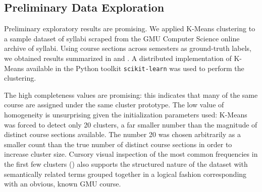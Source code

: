 \subsection{Preliminary Data Exploration}

Preliminary exploratory results are promising. We applied K-Means
clustering to a sample dataset of syllabi scraped from the GMU Computer
Science online archive of syllabi. Using course sections across semesters
as ground-truth labels, we obtained results summarized in
 and . A
distributed implementation of K-Means available in the Python toolkit
\texttt{scikit-learn} was used to perform the clustering.

The high completeness values are promising: this indicates that many of the
same course are assigned under the same cluster prototype. The low value of
homogeneity is unsurprising given the initialization parameters used:
K-Means was forced to detect only 20 clusters, a far smaller number than
the magnitude of distinct course sections available. The number 20 was
chosen arbitrarily as a smaller count than the true number of distinct
course sections in order to increase cluster size. Cursory visual
inspection of the most common frequencies in the first few clusters
() also supports the structured nature of the
dataset with semantically related terms grouped together in a logical
fashion corresponding with an obvious, known GMU course.

